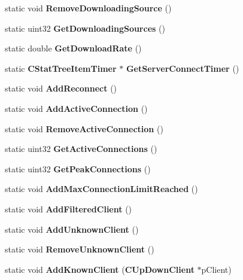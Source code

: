 \begin{DoxyCompactItemize}
\item 
static void {\bfseries RemoveDownloadingSource} ()\label{classCStatistics_a601ee10c840aa4e75c33b5639be775db}

\item 
static uint32 {\bfseries GetDownloadingSources} ()\label{classCStatistics_ad968f53f5416ea5af51da9b2fd54c01c}

\item 
static double {\bfseries GetDownloadRate} ()\label{classCStatistics_ac413493ea2052902584f3f66455c5b09}

\item 
static {\bf CStatTreeItemTimer} $\ast$ {\bfseries GetServerConnectTimer} ()\label{classCStatistics_a91776b0d6d9849e18a35c0b05ed4cb05}

\item 
static void {\bfseries AddReconnect} ()\label{classCStatistics_a1fa8fb808cadec2623a28700a60d0c4e}

\item 
static void {\bfseries AddActiveConnection} ()\label{classCStatistics_a487669012f5142fc21cb517b380dc04e}

\item 
static void {\bfseries RemoveActiveConnection} ()\label{classCStatistics_a7facbff61d648532dcf0949ac2f77d51}

\item 
static uint32 {\bfseries GetActiveConnections} ()\label{classCStatistics_a4f4695ecdc7aaaac320e24c151f34eec}

\item 
static uint32 {\bfseries GetPeakConnections} ()\label{classCStatistics_affbbc5ebcb7369a0fa8f038eab2d088c}

\item 
static void {\bfseries AddMaxConnectionLimitReached} ()\label{classCStatistics_a76af3f6c46ad7936bf8db0eec80ffbf0}

\item 
static void {\bfseries AddFilteredClient} ()\label{classCStatistics_a5fd0c1fbb98c54d528ecdca39cf12c9a}

\item 
static void {\bfseries AddUnknownClient} ()\label{classCStatistics_a3ec17b7d6c1cb0cd9a3b44632266d509}

\item 
static void {\bfseries RemoveUnknownClient} ()\label{classCStatistics_ab9f2c789060d561590dd7d5e9465ee51}

\item 
static void {\bfseries AddKnownClient} ({\bf CUpDownClient} $\ast$pClient)\label{classCStatistics_a000cc7d1485553182c2a1fdcad4b0891}


\end{DoxyCompactItemize}
